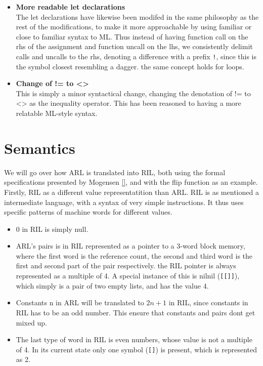 \documentclass[a4paper]{article}
\begin{document}
\begin{itemize}
\item \textbf{More readable let declarations}\\
The let declarations have likewise been modifed in the same philosophy as the rest of the modifications, to make it more approachable by using familiar or close to familiar syntax to ML. Thus instead of having function call on the rhs of the assignment and function uncall on the lhs, we consistently delimit calls and uncalls to the rhs, denoting a difference with a prefix \texttt{!}, since this is the symbol closest resembling a dagger. the same concept holds for loops.
\item \textbf{Change of != to <>}\\
This is simply a minor syntactical change, changing the denotation of != to <> as the inequality operator. This has been reasoned to having a more relatable ML-style syntax.
\end{itemize}

\section{Semantics}
\label{sec:org19d55f9}
We will go over how ARL is translated into RIL, both using the formal specifications presented by Mogensen \ref{}, and with the flip function as an example.
Firstly, RIL as a different value representatition than ARL. RIL is as mentioned a intermediate language, with a syntax of very simple instructions. It thus uses specific patterns of machine words for different values.
\begin{itemize}
\item 0 in RIL is simply null.
\item ARL's pairs is in RIL represented as a pointer to a 3-word block memory, where the first word is the reference count, the second and third word is the first and second part of the pair respectively. the RIL pointer is always represented as a multiple of 4. A special instance of this is nilnil (\texttt{[[]]}), which simply is a pair of two empty lists, and has the value 4.
\item Constants n in ARL will be translated to \(2n+1\) in RIL, since constants in RIL has to be an odd number. This ensure that constants and pairs dont get mixed up.
\item The last type of word in RIL is even numbers, whose value is not a multiple of 4.
In its current state only one symbol (\texttt{[]}) is present, which is represented as 2.
\end{itemize}
\end{document}

